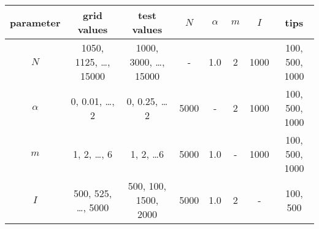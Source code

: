\begin{tabular}{cccccccc}
  parameter & grid values & test values & $N$ & $\alpha$ & $m$ & $I$ & tips \\
  \hline
  $N$ & 1050, 1125, \ldots, 15000 & 1000, 3000, \ldots, 15000 & - & 1.0 & 2 & 1000 & 100, 500, 1000 \\
  $\alpha$ & 0, 0.01, \ldots, 2 & 0, 0.25, \ldots 2 & 5000 & - & 2 & 1000 & 100, 500, 1000 \\
  $m$ & 1, 2, \ldots, 6 & 1, 2, \ldots 6 & 5000 & 1.0 & - & 1000 & 100, 500, 1000 \\
  $I$ & 500, 525, \ldots, 5000 & 500, 100, 1500, 2000 & 5000 & 1.0 & 2 & - & 100, 500 \\
  \hline
\end{tabular}
